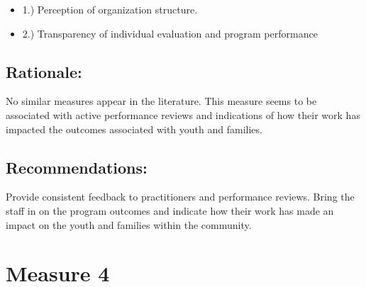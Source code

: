 \documentclass[]{article}
\providecommand{\tightlist}{%
  \setlength{\itemsep}{0pt}\setlength{\parskip}{0pt}}
\begin{document}
\begin{itemize}
\tightlist
\item
  1.) Perception of organization structure.
\item
  2.) Transparency of individual evaluation and program performance
\end{itemize}

\subsection{\texorpdfstring{\textbf{Rationale}:}{Rationale:}}\label{rationale-2}

No similar measures appear in the literature. This measure seems to be
associated with active performance reviews and indications of how their
work has impacted the outcomes associated with youth and families.

\subsection{\texorpdfstring{\textbf{Recommendations}:}{Recommendations:}}\label{recommendations-2}

Provide consistent feedback to practitioners and performance reviews.
Bring the staff in on the program outcomes and indicate how their work
has made an impact on the youth and families within the community.

\section{Measure 4}\label{measure-4}
\end{document}
